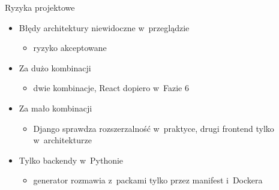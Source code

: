 \documentclass[aspectratio=169, 11pt]{beamer}
\begin{document}
\begin{frame}{Ryzyka projektowe}
  \begin{itemize}
    \item Błędy architektury niewidoczne w~przeglądzie
    \begin{itemize}
      \item ryzyko akceptowane
    \end{itemize}
    \item Za dużo kombinacji
    \begin{itemize}
      \item dwie kombinacje, React dopiero w~Fazie 6
    \end{itemize}
    \item Za mało kombinacji
    \begin{itemize}
      \item Django sprawdza rozszerzalność w~praktyce, drugi frontend tylko w~architekturze
    \end{itemize}
    \item Tylko backendy w~Pythonie
    \begin{itemize}
      \item generator rozmawia z~packami tylko przez manifest i~Dockera
    \end{itemize}
  \end{itemize}
\end{frame}
\end{document}
